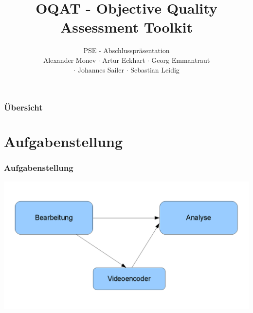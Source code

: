 \documentclass[t]{beamer}
\title{OQAT - Objective Quality Assessment Toolkit}
\subtitle{PSE - Abschlusspräsentation \\[0.3cm]
Alexander Monev $\cdot$ Artur Eckhart $\cdot$ Georg Emmantraut\\ $\cdot$ Johannes Sailer  $\cdot$ Sebastian
Leidig}
\institute[ITEC]{Institut für Technische Informatik}
\begin{document}
\begin{frame}
	\maketitle
\end{frame}

\begin{frame}
	\frametitle{Übersicht}
	\tableofcontents
\end{frame}

\section{Aufgabenstellung}
\begin{frame}
	\frametitle{Aufgabenstellung}
	\begin{center}
		\vspace*{\fill}
		\includegraphics[scale=.35]{img/aufgabe.png}
		\vspace*{\fill} ~\\
	\end{center}
\end{frame}
\end{document}
